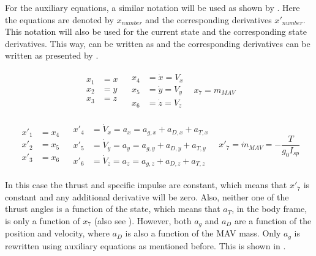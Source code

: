 For the auxiliary equations, a similar notation will be used as shown by \cite{scott2008high}. Here the equations are denoted by $x_{number}$ and the corresponding derivatives $x'_{number}$. This notation will also be used for the current state and the corresponding state derivatives. This way,  can be written as  and the corresponding derivatives can be written as presented by .

\begin{align} \label{eq:stateX}
\begin{split} 
x_{1}&=x\\
x_{2}&=y\\
x_{3}&=z
\end{split} 
&
\begin{split}
x_{4}&=\dot{x}=V_{x}\\
x_{5}&=\dot{y}=V_{y}\\
x_{6}&=\dot{z}=V_{z}
\end{split}
&
x_{7}=m_{MAV}
\end{align}


\begin{align} \label{eq:state_derivativesX}
\begin{split} 
x'_{1}&=x_{4}\\
x'_{2}&=x_{5}\\
x'_{3}&=x_{6}
\end{split} 
&
\begin{split}
x'_{4}&=\dot{V}_{x}=a_{x}=a_{g,x}+a_{D,x}+a_{T,x}\\
x'_{5}&=\dot{V}_{y}=a_{y}=a_{g,y}+a_{D,y}+a_{T,y}\\
x'_{6}&=\dot{V}_{z}=a_{z}=a_{g,z}+a_{D,z}+a_{T,z}
\end{split}
&
x'_{7}=\dot{m}_{MAV}=-\dfrac{T}{g_{0}I_{sp}}
\end{align}

In this case the thrust and specific impulse are constant, which means that $x'_{7}$ is constant and any additional derivative will be zero. Also, neither one of the thrust angles is a function of the state, which means that $a_{T}$, in the body frame, is only a function of $x_{7}$ (also see ). However, both $a_{g}$ and $a_{D}$ are a function of the position and velocity, where $a_{D}$ is also a function of the \ac{MAV} mass. Only $a_{g}$ is rewritten using auxiliary equations as mentioned before. This is shown in .





